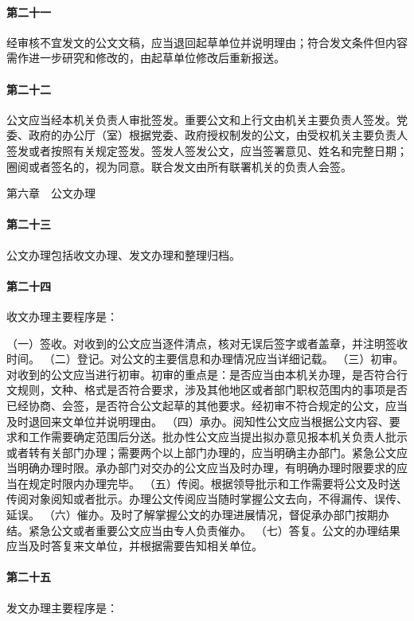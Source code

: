 \documentclass{gbt9704}
\begin{document}
\paragraph{第二十一}经审核不宜发文的公文文稿，应当退回起草单位并说明理由；符合发文条件但内容需作进一步研究和修改的，由起草单位修改后重新报送。

\paragraph{第二十二}公文应当经本机关负责人审批签发。重要公文和上行文由机关主要负责人签发。党委、政府的办公厅（室）根据党委、政府授权制发的公文，由受权机关主要负责人签发或者按照有关规定签发。签发人签发公文，应当签署意见、姓名和完整日期；圈阅或者签名的，视为同意。联合发文由所有联署机关的负责人会签。


第六章　公文办理


\paragraph{第二十三}公文办理包括收文办理、发文办理和整理归档。

\paragraph{第二十四}收文办理主要程序是：

（一）签收。对收到的公文应当逐件清点，核对无误后签字或者盖章，并注明签收时间。
（二）登记。对公文的主要信息和办理情况应当详细记载。
（三）初审。对收到的公文应当进行初审。初审的重点是：是否应当由本机关办理，是否符合行文规则，文种、格式是否符合要求，涉及其他地区或者部门职权范围内的事项是否已经协商、会签，是否符合公文起草的其他要求。经初审不符合规定的公文，应当及时退回来文单位并说明理由。
（四）承办。阅知性公文应当根据公文内容、要求和工作需要确定范围后分送。批办性公文应当提出拟办意见报本机关负责人批示或者转有关部门办理；需要两个以上部门办理的，应当明确主办部门。紧急公文应当明确办理时限。承办部门对交办的公文应当及时办理，有明确办理时限要求的应当在规定时限内办理完毕。
（五）传阅。根据领导批示和工作需要将公文及时送传阅对象阅知或者批示。办理公文传阅应当随时掌握公文去向，不得漏传、误传、延误。
（六）催办。及时了解掌握公文的办理进展情况，督促承办部门按期办结。紧急公文或者重要公文应当由专人负责催办。
（七）答复。公文的办理结果应当及时答复来文单位，并根据需要告知相关单位。
\paragraph{第二十五}发文办理主要程序是：
\end{document}
